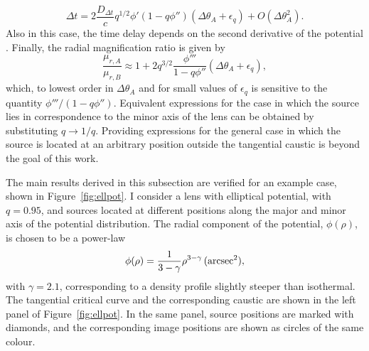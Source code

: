 \documentclass[usenatbib]{mnras}
\def\Fref#1{Figure~\ref{#1}\xspace}
\begin{document}
\begin{equation}\label{eq:ellpot_dt}
\Delta t = 2\frac{D_{\Delta t}}{c}q^{1/2}\phi'(1 - q\phi'')(\Delta\theta_A + \epsilon_q) + O(\Delta\theta_A^2).
\end{equation}
Also in this case, the time delay depends on the second derivative of the potential \citep[see also][]{Koc02}.
Finally, the radial magnification ratio is given by
\begin{equation}\label{eq:ellpot_radmagrat}
\frac{\mu_{r,A}}{\mu_{r,B}} \approx 1 + 2q^{3/2}\frac{\phi'''}{1-q\phi''}(\Delta\theta_A + \epsilon_q),
\end{equation}
which, to lowest order in $\Delta\theta_A$ and for small values of $\epsilon_q$ is sensitive to the quantity $\phi'''/(1-q\phi'')$.
Equivalent expressions for the case in which the source lies in correspondence to the minor axis of the lens can be obtained by substituting $q \rightarrow 1/q$.
Providing expressions for the general case in which the source is located at an arbitrary position outside the tangential caustic is beyond the goal of this work.

The main results derived in this subsection are verified for an example case, shown in \Fref{fig:ellpot}. I consider a lens with elliptical potential, with $q=0.95$, and sources located at different positions along the major and minor axis of the potential distribution.
The radial component of the potential, $\phi(\rho)$, is chosen to be a power-law
\begin{equation}\label{eq:ellpot_powerlawpot}
\phi(\rho) = \frac{1}{3-\gamma}\rho^{3-\gamma}\,(\rm{arcsec}^2),
\end{equation}
with $\gamma=2.1$, corresponding to a density profile slightly steeper than isothermal.
The tangential critical curve and the corresponding caustic are shown in the left panel of \Fref{fig:ellpot}. In the same panel, source positions are marked with diamonds, and the corresponding image positions are shown as circles of the same colour.
\end{document}
